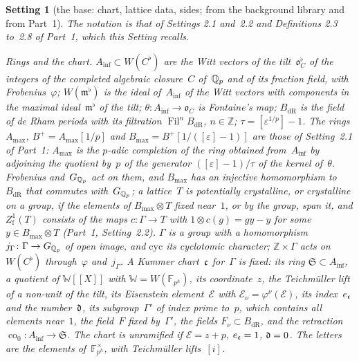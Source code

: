 \documentclass[11pt,a4paper]{article}
\newcommand{\kw}[1]{\emph{#1}}
\newcommand{\m}[1]{\mbox{$#1$}}        %
\theoremstyle{plainx}
\theoremstyle{uprightx}
\newtheorem{setting}[theorem]{Setting}          %
\providecommand{\Ainf}{A_{\inf}}\providecommand{\WC}{W(C^{\flat})}\providecommand{\BdR}{B_{\mathrm{dR}}}
\providecommand{\Fil}{\operatorname{Fil}}\providecommand{\fS}{\mathfrak{S}}\providecommand{\cE}{\mathcal{E}}
\providecommand{\WW}{\mathbb{W}}\providecommand{\Per}{\operatorname{Per}}\providecommand{\pr}{\operatorname{pr}}
\begin{document}
\begin{setting}[the base: chart, lattice data, sides; from the background library and from Part~1]\label{set:base}
The notation is that of Settings 2.1 and~2.2 and Definitions 2.3 to~2.8 of Part~1, which this Setting recalls.

\emph{Rings and the chart.} \m{\Ainf\subset\WC} are the Witt vectors of the tilt~$\mathfrak{o}_C^\flat$ of the
integers of the completed algebraic closure~$C$ of~$\mathbb{Q}_p$ and of its fraction field, with Frobenius~$\varphi$;
\m{W(\mathfrak{m}^\flat)} is the ideal of~$\Ainf$ of the Witt vectors with components in the maximal
ideal~$\mathfrak{m}^\flat$ of the tilt; $\theta\colon\Ainf\to\mathfrak{o}_C$ is Fontaine's map; $\BdR$ is the
field of de Rham periods with its filtration \m{\Fil^{n}\BdR}, \m{n\in\mathbb{Z}}; \m{\tau=[\varepsilon^{1/p}]-1}.
The rings $A_{\max}$, \m{B^{+}=A_{\max}[1/p]} and \m{B_{\max}=B^{+}[1/([\varepsilon]-1)]} are those of
Setting~2.1 of Part~1: $A_{\max}$ is the $p$-adic completion of the ring obtained from~$\Ainf$ by adjoining
the quotient by~$p$ of the generator \m{([\varepsilon]-1)/\tau} of the kernel of~$\theta$. Frobenius
and~$G_{\mathbb{Q}_p}$ act on them, and \m{B_{\max}} has an injective homomorphism to~$\BdR$ that commutes with~$G_{\mathbb{Q}_p}$;
a lattice~$T$ is potentially crystalline, or crystalline on a group, if the elements of \m{B_{\max}\otimes T}
fixed near~$1$, or by the group, span it, and \m{Z^{1}_{\mathrm{f}}(T)} consists of the maps
\m{c\colon\Gamma\to T} with \m{1\otimes c(g)=gy-y} for some \m{y\in B_{\max}\otimes T} (Part~1,
Setting~2.2).
$\Gamma$ is a group with a homomorphism \m{j_\Gamma\colon\Gamma\to\GQp} of open image, and $\mathrm{cyc}$ its cyclotomic
character; \m{\mathbb{Z}\times\Gamma} acts on~$\WC$ through~$\varphi$ and~$j_\Gamma$. A Kummer chart~$\mathfrak{c}$
for~$\Gamma$ is fixed: its ring \m{\fS\subset\Ainf}, a quotient of \m{\WW[[X]]} with \m{\WW=W(\mathbb{F}_{p^h})},
its coordinate~$z$, the Teichmüller lift of a non-unit of the tilt, its Eisenstein element~$\cE$ with
\m{\cE_\nu=\varphi^{\nu}(\cE)}, its index~$e_{\mathfrak{c}}$ and the number~$\mathfrak{d}$, its subgroup~$\Gamma'$ of index prime
to~$p$, which contains all elements near~$1$, the field~$F$ fixed by~$\Gamma'$, the fields
\m{F_\nu\subset\BdR}, and the retraction $\operatorname{co}_0\colon\Ainf\to\fS$. The chart is \kw{unramified} if
\m{\cE=z+p}, \m{e_{\fc}=1}, \m{\fd=0}. The \kw{letters} are the elements of~\m{\mathbb{F}_{p^h}^\times}, with
Teichmüller lifts~$[i]$.


\end{setting}
\end{document}
